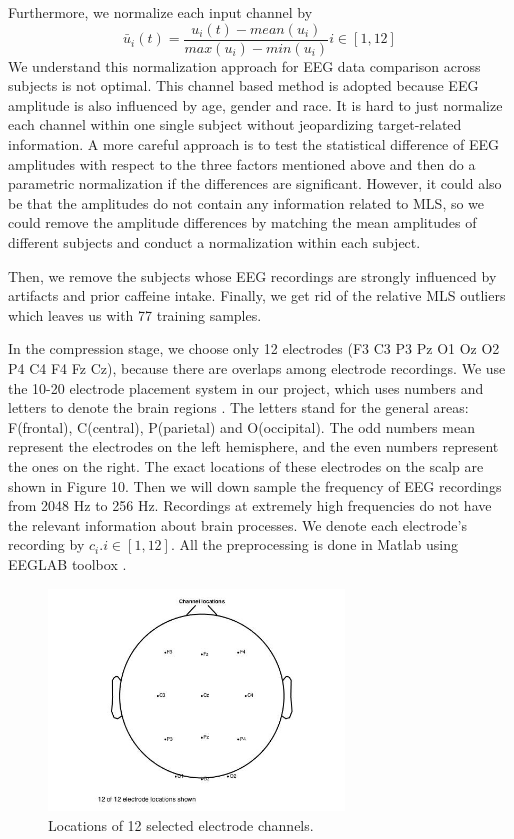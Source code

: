 \documentclass[a4paper,11pt,oneside]{article}
\begin{document}
	Furthermore, we normalize each input channel by 
	$$ \bar{u}_i(t) = \frac{u_i(t) - mean(u_i)}{max(u_i) - min(u_i)} i \in [1, 12] $$
	We understand this normalization approach for EEG data comparison across subjects is not optimal. This channel based method is adopted because EEG amplitude is also influenced by age, gender and race. It is hard to just normalize each channel within one single subject without jeopardizing target-related information. A more careful approach is to test the statistical difference of EEG amplitudes with respect to the three factors mentioned above and then do a parametric normalization if the differences are significant. However, it could also be that the amplitudes do not contain any information related to MLS, so we could remove the amplitude differences by matching the mean amplitudes of different subjects and conduct a normalization within each subject.
	
	Then, we remove the subjects whose EEG recordings are strongly influenced by artifacts and prior caffeine intake. Finally, we get rid of the relative MLS outliers which leaves us with 77 training samples.
		
	In the compression stage, we choose only 12 electrodes (F3 C3 P3 Pz O1 Oz O2 P4 C4 F4 Fz Cz), because  there are overlaps among electrode recordings. We use the 10-20 electrode placement system in our project, which uses numbers and letters to denote the brain regions \cite{klem1999ten}. The letters stand for the general areas: F(frontal), C(central), P(parietal) and O(occipital). The odd numbers mean represent the electrodes on the left hemisphere, and the even numbers represent the ones on the right. The exact locations of these electrodes on the scalp are shown in Figure 10. Then we will down sample the frequency of EEG recordings from 2048 Hz to 256 Hz. Recordings at extremely high frequencies do not have the relevant information about brain processes. We denote each electrode's recording by $c_i. i \in [1, 12]$. 
	All the preprocessing is done in Matlab using EEGLAB toolbox \cite{delorme2004eeglab}.
	
	\begin{figure}[!h]
		\begin{center}
			\includegraphics[width=0.7\textwidth]{img/chanLocation}
		\end{center}
		\caption{Locations of 12 selected electrode channels.}
	\end{figure}
\end{document}
